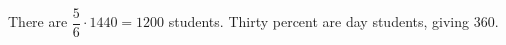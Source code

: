 There are $\dfrac{5}{6}\cdot1440=1200$ students. Thirty percent are day students, giving $\boxed{360}$.
